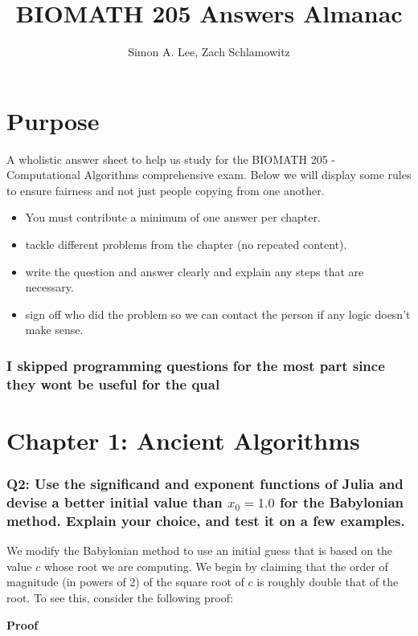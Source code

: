 \documentclass[8pt]{article}
\title{BIOMATH 205 Answers Almanac}
\author{Simon A. Lee, Zach Schlamowitz}
\date{}
\begin{document}
\maketitle


\section*{Purpose}

A wholistic answer sheet to help us study for the BIOMATH 205 - Computational Algorithms comprehensive exam. Below we will display some rules to ensure fairness and not just people copying from one another.

\begin{itemize}
    \item You must contribute a minimum of one answer per chapter.
    \item tackle different problems from the chapter (no repeated content). 
    \item write the question and answer clearly and explain any steps that are necessary. 
    \item sign off who did the problem so we can contact the person if any logic doesn't make sense.
\end{itemize}

\subsubsection*{I skipped programming questions for the most part since they wont be useful for the qual}

\section*{Chapter 1: Ancient Algorithms}
\subsubsection*{Q2: Use the significand and exponent functions of Julia and devise a better initial value than $x_0 = 1.0$ for the Babylonian method. Explain your choice, and test it on a few examples.}

We modify the Babylonian method to use an initial guess that is based on the value $c$ whose root we are computing. We begin by claiming that the order of magnitude (in powers of 2) of the square root of $c$ is roughly double that of the root. To see this, consider the following proof:

\textbf{Proof}
\end{document}
